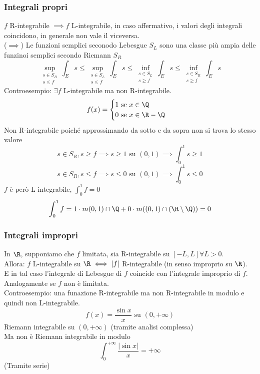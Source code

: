 \subsubsection{Integrali propri}
$f$ R-integrabile $\implies f$ L-integrabile, in caso affermativo, i valori degli integrali coincidono, in generale non vale il viceversa.
\\($\implies$) Le funzioni semplici seconodo Lebesgue $S_L$ sono una classe più ampia delle funzinoi semplici secondo Riemann $S_R$
\[\sup_{\substack{s\in S_R\\s\le f}}\int_{E}^{}s\le \sup_{\substack{s\in S_L\\s\le f}}\int_{E}^{} s \le \inf_{\substack{s \in S_L\\s\ge f}}\int_{E}^{}  s\le   \inf_{\substack{s\in S_R\\s\ge f}}\int_{E}^{}s\]
Controesempio: $\exists f$ L-integrabile ma non R-integrabile.
\[f(x)=\begin{cases}
	1\text{ se }x\in\Q\\
	0\text{ se }x\in \R-\Q
\end{cases}\]
Non R-integrabile poiché approssimando da sotto e da sopra non si trova lo stesso valore
\[s\in S_R,s\ge f\implies s\ge 1\text{ su }(0,1)\implies \int_{0}^{1} s\ge 1\]
\[s\in S_R, s\le f\implies s\le 0\text{ su }(0,1)\implies \int_{0}^{1} s\le 0\]
$f$ è però L-integrabile, $\int_{0}^{1} f=0$
\[\int_{0}^{1} f=1\cdot m(0,1)\cap\Q+0\cdot m((0,1)\cap(\R\setminus\Q))=0\]
\subsubsection{Integrali impropri}
In $\R$, supponiamo che $f$ limitata, sia R-integrabile su $[-L,L]\forall L>0$.
\\Allora: $f$ L-integrabile su $\R \iff|f|$ R-integrabile (in senso improprio su $\R$).
\\E in tal caso l'integrale di Lebesgue di $f$ coincide con l'integrale improprio di $f$.
\\Analogamente se $f$ non è limitata.
\\Controesempio: una funazione R-integrabile ma non R-integrabile in modulo e quindi non L-integrabile.
\[f(x)= \frac{\sin x}{x}\text{  su }(0,+\infty)\]
Riemann integrabile su $(0,+\infty)$ (tramite analisi complessa)
\\Ma non è Riemann integrabile in modulo
\[\int_{0}^{+\infty} \frac{|\sin x|}{x}=+\infty\]
(Tramite serie)
